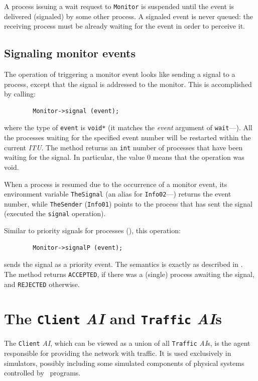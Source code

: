 A process issuing a wait request to {\tt Monitor}
is suspended until the event is
delivered (signaled) by some other process.
A signaled event is never queued:
the receiving
process must be already waiting for the event in order to perceive it.

\subsection{Signaling monitor events}
\label{rm_mo_si}

The operation of triggering a monitor event looks like sending a signal to
a process, except that the signal is addressed to the monitor.
This is accomplished by calling:
\begin{verbatim}
        Monitor->signal (event);
\end{verbatim}
\noindent
where the type of {\tt event} is {\tt void*} (it matches the {\em event\/}
argument of {\tt wait}---).
All the processes waiting for the specified event number will be restarted
within the current {\em ITU\/}.
The method returns an {\tt int} number of processes that have been waiting
for the signal.
In particular, the value 0 means that the operation was void.

When a process is resumed due to the occurrence of a monitor event, its
environment variable {\tt TheSignal} (an alias for
{\tt Info02}---) returns the event number, while
{\tt TheSender} ({\tt Info01}) points to the process that has sent the
signal (executed the {\tt signal} operation).

Similar to priority signals for processes (), this operation:
\begin{verbatim}
        Monitor->signalP (event);
\end{verbatim}
\noindent
sends the signal as a priority event.
The semantics is exactly as described in .
The method returns {\tt ACCEPTED}, if there was a (single) process awaiting
the signal, and {\tt REJECTED} otherwise.

\section{The {\tt Client} {\em AI\/} and {\tt Traffic} {\em AI\/}s}
\label{rm_cl}

The {\tt Client} {\em AI}, which can be viewed as a union of all
{\tt Traffic\/} {\em AI\/}s, is the agent responsible for providing the
network with traffic.
It is used exclusively in simulators, possibly including some
simulated components of physical systems controlled by \smurph\ programs.

